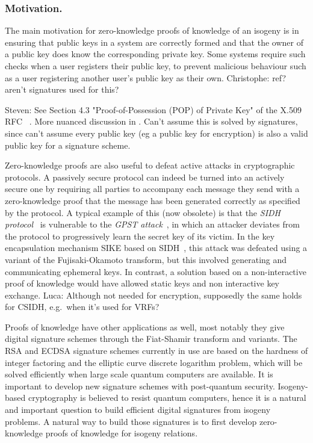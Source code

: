 \documentclass{llncs}
\newcommand{\comment}[1]{{\color{gray}#1}}
\newcommand{\CP}[1]{\comment{Christophe: #1}}
\newcommand{\LDF}[1]{\comment{Luca: #1}}
\newcommand{\SG}[1]{\comment{Steven: #1}}
\begin{document}
\subsubsection{Motivation.}
%
The main motivation for zero-knowledge proofs of knowledge of an isogeny is in ensuring that public keys in a system are correctly formed and that the owner of a public key does know the corresponding private key. Some systems require such checks when a user registers their public key, to prevent malicious behaviour such as a user registering another user's public key as their own. \CP{ref? aren't signatures used for this?}

\SG{See Section 4.3 "Proof-of-Possession (POP) of Private Key" of the X.509 RFC ~\cite{X509}. More nuanced discussion in \cite{BFPW07}. Can't assume this is solved by signatures, since can't assume every public key (eg a public key for encryption) is also a valid public key for a signature scheme.}

Zero-knowledge proofs are also useful to defeat active attacks in cryptographic protocols. A passively secure protocol can indeed be turned into an actively secure one by requiring all parties to accompany each message they send with a zero-knowledge proof that the message has been generated correctly as specified by the protocol.
%
A typical example of this (now obsolete) is that the \emph{SIDH protocol}~\cite{DFJP14} is vulnerable to the \emph{GPST attack}~\cite{GPST16}, in which an attacker deviates from the protocol to progressively learn the secret key of its victim. 
In the key encapsulation mechanism SIKE based on SIDH~\cite{sike2017}, this attack was defeated using a variant of the Fujisaki-Okamoto transform, but this involved generating and communicating ephemeral keys. In contrast, a solution based on a non-interactive proof of knowledge would have allowed static keys and non interactive key exchange.
\LDF{Although not needed for encryption, supposedly the same holds for CSIDH, e.g.\ when it's used for VRFs?}

Proofs of knowledge have other applications as well, most notably they give digital signature schemes through the Fiat-Shamir transform and variants. 
%
The RSA and ECDSA signature schemes currently in use are based on the hardness of integer factoring and the elliptic curve discrete logarithm problem, which will be solved efficiently when large scale quantum computers are available.
It is important to develop new signature schemes with post-quantum security.
%
Isogeny-based cryptography is believed to resist quantum computers, hence it is a natural and important question to build efficient digital signatures from isogeny problems. A natural way to build those signatures is to first develop zero-knowledge proofs of knowledge for isogeny relations.
\end{document}
